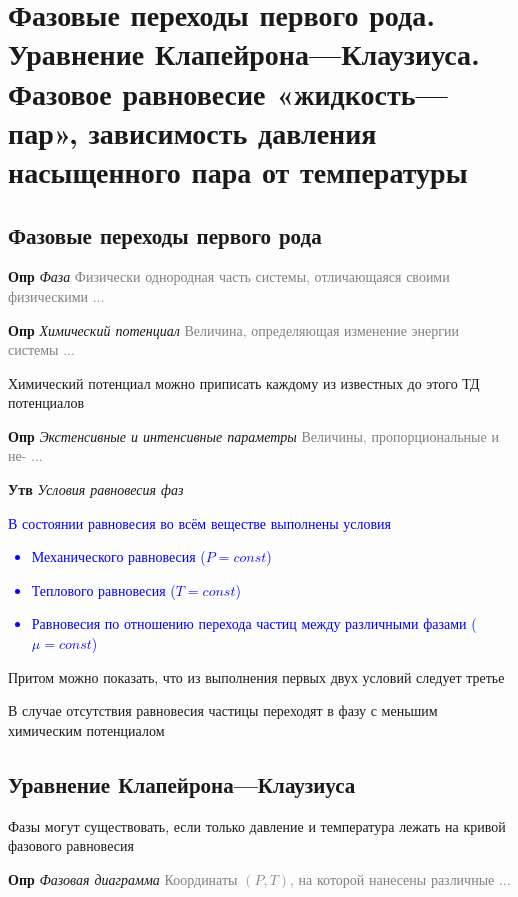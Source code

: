 \documentclass[a4paper, 14pt]{article}
\begin{document}
    \section{Фазовые переходы первого рода.
    Уравнение Клапейрона—Клаузиуса.
    Фазовое равновесие «жидкость—пар», зависимость давления насыщенного пара от температуры}
    
    \subsection{Фазовые переходы первого рода}
    
    \textbf{Опр} \textit{Фаза} \textcolor{gray}{Физически однородная часть системы, отличающаяся своими физическими ...}
    
    \textbf{Опр} \textit{Химический потенциал} \textcolor{gray}{Величина, определяющая изменение энергии системы ...}
    
    Химический потенциал можно приписать каждому из известных до этого ТД потенциалов
    
    \textbf{Опр} \textit{Экстенсивные и интенсивные параметры} \textcolor{gray}{Величины, пропорциональные и не- ...}
    
    \textbf{Утв} \textit{Условия равновесия фаз}
    
    \textcolor{blue}{В состоянии равновесия во всём веществе выполнены условия
        \begin{itemize}
            \item Механического равновесия ($P = const$)
            \item Теплового равновесия ($T = const$)
            \item Равновесия по отношению перехода частиц между различными фазами ($\mu = const$)
        \end{itemize}}
    
    Притом можно показать, что из выполнения первых двух условий следует третье
    
    В случае отсутствия равновесия частицы переходят в фазу с меньшим химическим потенциалом
    
    \subsection{Уравнение Клапейрона—Клаузиуса}
    
    Фазы могут существовать, если только давление и температура лежать на кривой фазового равновесия
    
    \textbf{Опр} \textit{Фазовая диаграмма} \textcolor{gray}{Координаты $(P, T)$, на которой нанесены различные ...}
    
\end{document}
